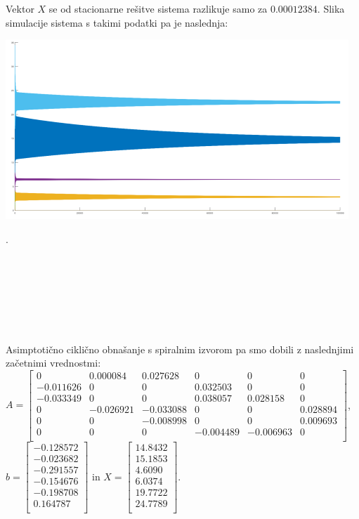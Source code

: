 \documentclass[a4paper, 12pt]{article}
\begin{document}
Vektor $ X $ se od stacionarne rešitve sistema razlikuje samo za $ 0.00012384 $. Slika simulacije
sistema s takimi podatki pa je naslednja:
\begin{center}
	\includegraphics{spiralni_lijak.png}
\end{center}
.
\\
\\
\\
\\
\\
\\
\\
\\
Asimptotično ciklično obnašanje s spiralnim izvorom pa smo dobili z naslednjimi
začetnimi vrednostmi:\\
$ A =
\begin{bmatrix}
	0 & 0.000084 & 0.027628 & 0 & 0 & 0 \\
	-0.011626 & 0 & 0 & 0.032503 & 0 & 0 \\
	-0.033349 & 0 & 0 & 0.038057 & 0.028158 & 0 \\
	0 & -0.026921 & -0.033088 & 0 & 0 & 0.028894 \\
	0 & 0 & -0.008998 & 0 & 0 & 0.009693 \\
	0 & 0 & 0 & -0.004489 & -0.006963 & 0 \\
\end{bmatrix} $, \\
$ b =
\begin{bmatrix}
	-0.128572 \\
	-0.023682 \\
	-0.291557 \\
	-0.154676 \\
	-0.198708 \\
	0.164787 \\
\end{bmatrix} $ in
$ X =
\begin{bmatrix}
	14.8432 \\
	15.1853 \\
	4.6090 \\
	6.0374 \\
	19.7722 \\
	24.7789 \\
\end{bmatrix} $. \\
\end{document}
